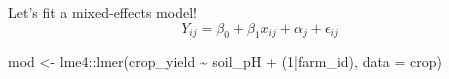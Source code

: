 \documentclass[
  ignorenonframetext,
  aspectratio=169,
]{beamer}
\newenvironment{Shaded}{\begin{snugshade}}{\end{snugshade}}
\newcommand{\AttributeTok}[1]{\textcolor[rgb]{0.40,0.45,0.13}{#1}}
\newcommand{\DecValTok}[1]{\textcolor[rgb]{0.68,0.00,0.00}{#1}}
\newcommand{\FunctionTok}[1]{\textcolor[rgb]{0.28,0.35,0.67}{#1}}
\newcommand{\NormalTok}[1]{\textcolor[rgb]{0.00,0.23,0.31}{#1}}
\newcommand{\OtherTok}[1]{\textcolor[rgb]{0.00,0.23,0.31}{#1}}
\newcommand{\SpecialCharTok}[1]{\textcolor[rgb]{0.37,0.37,0.37}{#1}}
\begin{document}
\begin{frame}[fragile]{Let's fit a mixed-effects model!}
\label{lets-fit-a-mixed-effects-model}
\begin{equation}
Y_{ij} = \beta_0 + \beta_1 x_{ij} + \alpha_j + \epsilon_{ij}
\end{equation}

\begin{Shaded}
\begin{Highlighting}[]
\NormalTok{mod }\OtherTok{\textless{}{-}}\NormalTok{ lme4}\SpecialCharTok{::}\FunctionTok{lmer}\NormalTok{(crop\_yield }\SpecialCharTok{\textasciitilde{}}\NormalTok{ soil\_pH }\SpecialCharTok{+}\NormalTok{ (}\DecValTok{1}\SpecialCharTok{|}\NormalTok{farm\_id), }\AttributeTok{data =}\NormalTok{ crop)}
\end{Highlighting}
\end{Shaded}
\end{frame}
\end{document}
